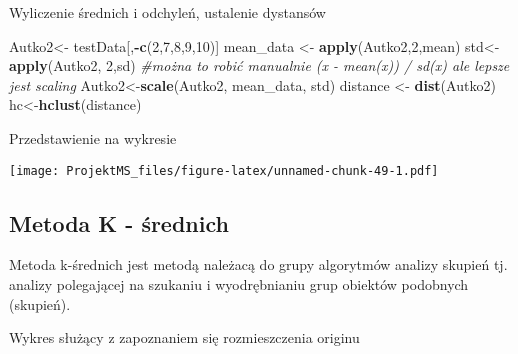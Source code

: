\documentclass[
]{article}
\newenvironment{Shaded}{\begin{snugshade}}{\end{snugshade}}
\newcommand{\CommentTok}[1]{\textcolor[rgb]{0.56,0.35,0.01}{\textit{#1}}}
\newcommand{\DataTypeTok}[1]{\textcolor[rgb]{0.13,0.29,0.53}{#1}}
\newcommand{\DecValTok}[1]{\textcolor[rgb]{0.00,0.00,0.81}{#1}}
\newcommand{\KeywordTok}[1]{\textcolor[rgb]{0.13,0.29,0.53}{\textbf{#1}}}
\newcommand{\NormalTok}[1]{#1}
\newcommand{\OperatorTok}[1]{\textcolor[rgb]{0.81,0.36,0.00}{\textbf{#1}}}
\newcommand{\StringTok}[1]{\textcolor[rgb]{0.31,0.60,0.02}{#1}}
\begin{document}
Wyliczenie średnich i odchyleń, ustalenie dystansów

\begin{Shaded}
\begin{Highlighting}[]
\NormalTok{Autko2<-}\StringTok{ }\NormalTok{testData[,}\OperatorTok{-}\KeywordTok{c}\NormalTok{(}\DecValTok{2}\NormalTok{,}\DecValTok{7}\NormalTok{,}\DecValTok{8}\NormalTok{,}\DecValTok{9}\NormalTok{,}\DecValTok{10}\NormalTok{)]}
\NormalTok{mean_data <-}\StringTok{ }\KeywordTok{apply}\NormalTok{(Autko2,}\DecValTok{2}\NormalTok{,mean)}
\NormalTok{std<-}\StringTok{ }\KeywordTok{apply}\NormalTok{(Autko2, }\DecValTok{2}\NormalTok{,sd)}
\CommentTok{#można to robić manualnie  (x - mean(x)) / sd(x) ale lepsze jest scaling}
\NormalTok{Autko2<-}\KeywordTok{scale}\NormalTok{(Autko2, mean_data, std)}
\NormalTok{distance <-}\StringTok{ }\KeywordTok{dist}\NormalTok{(Autko2)}
\NormalTok{hc<-}\KeywordTok{hclust}\NormalTok{(distance)}
\end{Highlighting}
\end{Shaded}

Przedstawienie na wykresie

\begin{Shaded}
\end{Shaded}

\texttt{[image: ProjektMS\_files/figure-latex/unnamed-chunk-49-1.pdf]}

\hypertarget{metoda-k---ux15brednich}{%
\subsection{Metoda K - średnich}\label{metoda-k---ux15brednich}}

Metoda k-średnich jest metodą należacą do grupy algorytmów analizy
skupień tj. analizy polegającej na szukaniu i wyodrębnianiu grup
obiektów podobnych (skupień).

Wykres służący z zapoznaniem się rozmieszczenia originu
\end{document}
